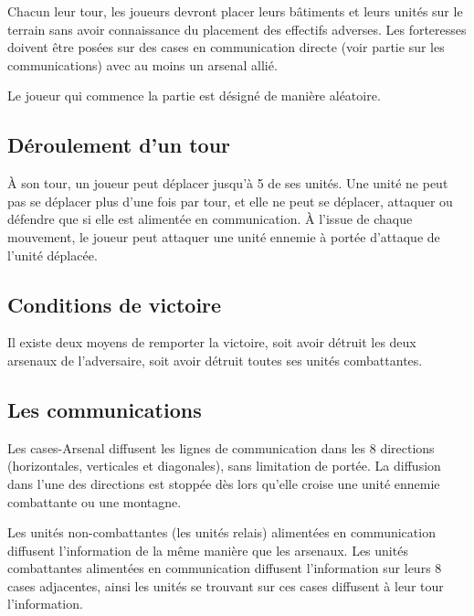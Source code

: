 \documentclass[a4paper]{report}
\begin{document}
Chacun leur tour, les joueurs devront placer leurs bâtiments et leurs unités sur le terrain sans avoir connaissance du placement des effectifs adverses. Les forteresses doivent être posées sur des cases en communication directe (voir partie sur les communications) avec au moins un arsenal allié.

Le joueur qui commence la partie est désigné de manière aléatoire.
 
\subsection{Déroulement d'un tour}
\`A son tour, un joueur peut déplacer jusqu'à 5 de ses unités. Une unité ne peut pas se déplacer plus d'une fois par tour, et elle ne peut se déplacer, attaquer ou défendre que si elle est alimentée en communication. À l'issue de chaque mouvement, le joueur peut attaquer une unité ennemie à portée d'attaque de l'unité déplacée.

\subsection{Conditions de victoire}
Il existe deux moyens de remporter la victoire, soit avoir détruit les deux arsenaux de l'adversaire, soit avoir détruit toutes ses unités combattantes.

\subsection{Les communications}
Les cases-Arsenal diffusent les lignes de communication dans les 8 directions (horizontales, verticales et diagonales), sans limitation de portée. La diffusion dans l'une des directions est stoppée dès lors qu'elle croise une unité ennemie combattante ou une montagne.

Les unités non-combattantes (les unités relais) alimentées en communication diffusent l'information de la même manière que les arsenaux. Les unités combattantes alimentées en communication diffusent l'information sur leurs 8 cases adjacentes, ainsi les unités se trouvant sur ces cases diffusent à leur tour l'information.
\end{document}
